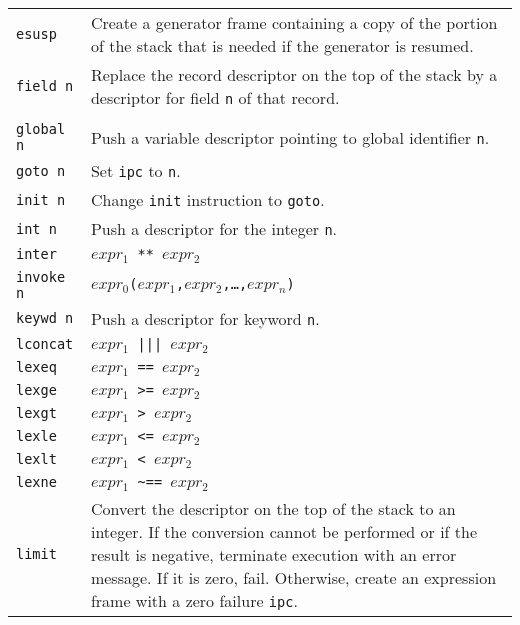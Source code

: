 \begin{supertabular}{l@{\hspace{1.5cm}}p{13.5cm}}
\texttt{esusp} & Create a generator frame containing a copy of the portion of
the stack that is needed if the generator is resumed.\\

\texttt{field n} & Replace the record descriptor on the top of the stack by a
descriptor for field \texttt{n} of that record.\\

\\

\texttt{global n} & Push a variable descriptor pointing to global identifier \texttt{n}.\\

\texttt{goto n} & Set \texttt{ipc} to \texttt{n}.\\

\texttt{init n} & Change \texttt{init} instruction to \texttt{goto}.\\

\texttt{int n}  & Push a descriptor for the integer \texttt{n}.\\

\texttt{inter}  & \texttt{$expr_1$ ** $expr_2$}\\

\texttt{invoke n} & \texttt{$expr_0$($expr_1$,$expr_2$,\dots,$expr_n$)}\\

\texttt{keywd n} & Push a descriptor for keyword \texttt{n}.\\

\texttt{lconcat} & \texttt{$expr_1$ ||| $expr_2$}\\

\texttt{lexeq}   & \texttt{$expr_1$ == $expr_2$}\\

\texttt{lexge}   & \texttt{$expr_1$ >= $expr_2$}\\

\texttt{lexgt}   & \texttt{$expr_1$ > $expr_2$}\\

\texttt{lexle}   & \texttt{$expr_1$ <= $expr_2$}\\

\texttt{lexlt}   & \texttt{$expr_1$ < $expr_2$}\\

\texttt{lexne}   & \texttt{$expr_1$ \textasciitilde== $expr_2$}\\

\texttt{limit}   & Convert the descriptor on the top of the stack to an
integer. If the conversion cannot be performed or if the result is
negative, terminate execution with an error message. If it is zero,
fail. Otherwise, create an expression frame with a zero failure \texttt{ipc}.\\


\end{supertabular}
